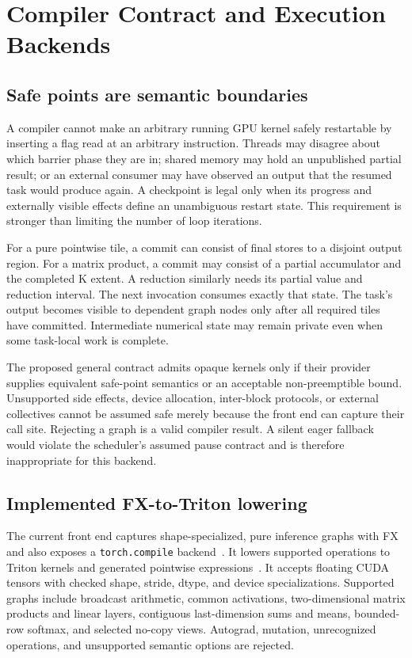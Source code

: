 \section{Compiler Contract and Execution Backends}
\label{sec:compiler}
\subsection{Safe points are semantic boundaries}
A compiler cannot make an arbitrary running GPU kernel safely restartable
by inserting a flag read at an arbitrary instruction. Threads may disagree
about which barrier phase they are in; shared memory may hold an unpublished
partial result; or an external consumer may have observed an output that
the resumed task would produce again. A checkpoint is legal only when its
progress and externally visible effects define an unambiguous restart state.
This requirement is stronger than limiting the number of loop iterations.

For a pure pointwise tile, a commit can consist of final stores to a disjoint
output region. For a matrix product, a commit may consist of a partial
accumulator and the completed K extent. A reduction similarly needs its
partial value and reduction interval. The next invocation consumes exactly
that state. The task's output becomes visible to dependent graph nodes only
after all required tiles have committed. Intermediate numerical state may
remain private even when some task-local work is complete.

The proposed general contract admits opaque kernels only if their provider
supplies equivalent safe-point semantics or an acceptable non-preemptible
bound. Unsupported side effects, device allocation, inter-block protocols,
or external collectives cannot be assumed safe merely because the front end
can capture their call site. Rejecting a graph is a valid compiler result.
A silent eager fallback would violate the scheduler's assumed pause contract
and is therefore inappropriate for this backend.

\subsection{Implemented FX-to-Triton lowering}
The current front end captures shape-specialized, pure inference graphs with
FX and also exposes a \texttt{torch.compile} backend~\cite{Reed2022FX}.
It lowers supported operations to Triton kernels and generated pointwise
expressions~\cite{Tillet2019Triton}. It accepts floating CUDA tensors with
checked shape, stride, dtype, and device specializations. Supported graphs
include broadcast arithmetic, common activations, two-dimensional matrix
products and linear layers, contiguous last-dimension sums and means,
bounded-row softmax, and selected no-copy views. Autograd, mutation,
unrecognized operations, and unsupported semantic options are rejected.

